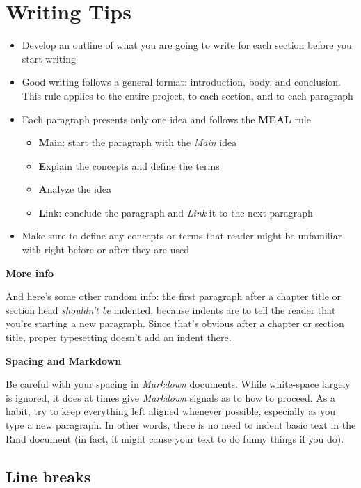 \documentclass[12pt,oneside]{chicagocapstone}
\providecommand{\tightlist}{%
  \setlength{\itemsep}{0pt}\setlength{\parskip}{0pt}}
\begin{document}
\section*{Writing Tips}\label{writing-tips}
\begin{itemize}
\tightlist
\item
  Develop an outline of what you are going to write for each section
  before you start writing
\item
  Good writing follows a general format: introduction, body, and
  conclusion. This rule applies to the entire project, to each section,
  and to each paragraph
\item
  Each paragraph presents only one idea and follows the \textbf{MEAL}
  rule
  \begin{itemize}
  \tightlist
  \item
    \textbf{M}ain: start the paragraph with the \emph{Main} idea
  \item
    \textbf{E}xplain the concepts and define the terms
  \item
    \textbf{A}nalyze the idea
  \item
    \textbf{L}ink: conclude the paragraph and \emph{Link} it to the next
    paragraph
  \end{itemize}
\item
  Make sure to define any concepts or terms that reader might be
  unfamiliar with right before or after they are used
\end{itemize}
\textbf{More info}

And here's some other random info: the first paragraph after a chapter
title or section head \emph{shouldn't be} indented, because indents are
to tell the reader that you're starting a new paragraph. Since that's
obvious after a chapter or section title, proper typesetting doesn't add
an indent there.

\textbf{Spacing and Markdown}

Be careful with your spacing in \emph{Markdown} documents. While
white-space largely is ignored, it does at times give \emph{Markdown}
signals as to how to proceed. As a habit, try to keep everything left
aligned whenever possible, especially as you type a new paragraph. In
other words, there is no need to indent basic text in the Rmd document
(in fact, it might cause your text to do funny things if you do).

\subsection*{Line breaks}\label{line-breaks}
\end{document}
